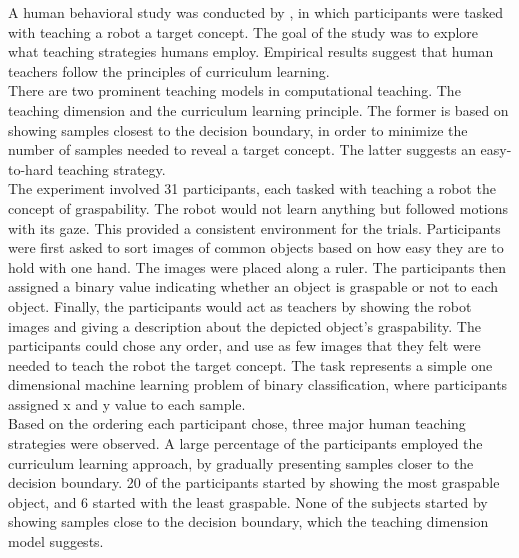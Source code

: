 


A human behavioral study was conducted by \citep{Khan_human_teach}, in which participants were tasked with teaching a robot a target concept. The goal of the study was to explore what teaching strategies humans employ. Empirical results suggest that human teachers follow the principles of curriculum learning. \\

There are two prominent teaching models in computational teaching. The teaching dimension and the curriculum  learning principle. The former is based on showing samples closest to the decision boundary, in order to minimize the number of samples needed to reveal a target concept. The latter suggests an easy-to-hard teaching strategy. \\

The experiment involved 31 participants, each tasked with teaching a robot the concept of graspability. The robot would not learn anything but followed motions with its gaze. This provided a consistent environment for the trials. Participants were first asked to sort images of common objects based on how easy they are to hold with one hand. The images were placed along a ruler.  The participants then assigned a binary value indicating whether an object is graspable or not to each object. Finally, the participants would act as teachers by showing the robot images and giving a description about the depicted object's graspability. The participants could chose any order, and use as few images that they felt were needed to teach the robot the target concept. The task represents a simple one dimensional machine learning problem of binary classification, where participants assigned x and y value to each sample. \\

Based on the ordering each participant chose, three major human teaching strategies were observed. A large percentage of the participants employed the curriculum learning approach, by gradually presenting samples closer to the decision boundary. 20 of the participants started by showing the most graspable object, and 6 started with the least graspable.  None of the subjects started by showing samples close to the decision boundary, which the teaching dimension model suggests.\\

